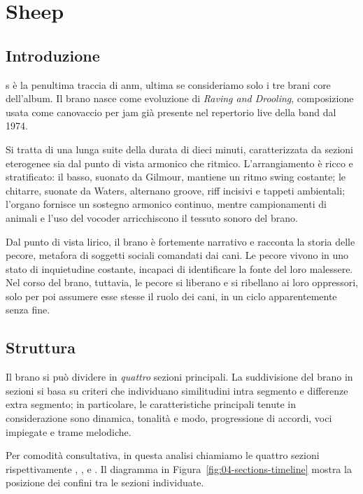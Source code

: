 \documentclass[class=book, crop=false, oneside, 12pt]{standalone}
\begin{document}
    \chapter{Sheep}

    \section{Introduzione}
    \label{sec:04-intro}

    \acrlong{s} è la penultima traccia di \acrshort{anm}, ultima se consideriamo solo i tre brani core dell'album. 
    Il brano nasce come evoluzione di \emph{Raving and Drooling}, composizione usata come canovaccio per jam già presente nel repertorio live della band dal 1974.
    
    Si tratta di una lunga suite della durata di dieci minuti, caratterizzata da sezioni eterogenee sia dal punto di vista armonico che ritmico. L'arrangiamento è ricco e stratificato: il basso, suonato da Gilmour, mantiene un ritmo swing costante; le chitarre, suonate da Waters, alternano groove, riff incisivi e tappeti ambientali; l'organo fornisce un sostegno armonico continuo, mentre campionamenti di animali e l'uso del vocoder arricchiscono il tessuto sonoro del brano.

    Dal punto di vista lirico, il brano è fortemente narrativo e racconta la storia delle pecore, metafora di soggetti sociali comandati dai cani. Le pecore vivono in uno stato di inquietudine costante, incapaci di identificare la fonte del loro malessere. Nel corso del brano, tuttavia, le pecore si liberano e si ribellano ai loro oppressori, solo per poi assumere esse stesse il ruolo dei cani, in un ciclo apparentemente senza fine.

    \section{Struttura}
    \label{sec:04-struttura}

    Il brano si può dividere in \emph{quattro} sezioni principali.
    La suddivisione del brano in sezioni si basa su criteri che individuano similitudini intra segmento e differenze extra segmento; in particolare, le caratteristiche principali tenute in considerazione sono dinamica, tonalità e modo, progressione di accordi, voci impiegate e trame melodiche.

    Per comodità consultativa, in questa analisi chiamiamo le quattro sezioni rispettivamente , ,  e . Il diagramma in Figura~\ref{fig:04-sections-timeline} mostra la posizione dei confini tra le sezioni individuate.
\end{document}
